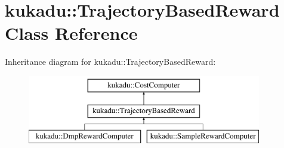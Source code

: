 \hypertarget{classkukadu_1_1TrajectoryBasedReward}{\section{kukadu\-:\-:Trajectory\-Based\-Reward Class Reference}
\label{classkukadu_1_1TrajectoryBasedReward}
}
Inheritance diagram for kukadu\-:\-:Trajectory\-Based\-Reward\-:\begin{figure}[H]
\begin{center}
\leavevmode
\includegraphics[height=3.000000cm]{classkukadu_1_1TrajectoryBasedReward}
\end{center}
\end{figure}
